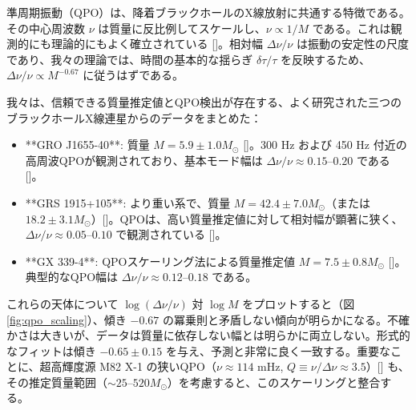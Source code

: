 \documentclass[12pt,a4paper]{article}
\begin{document}
	準周期振動（QPO）は、降着ブラックホールのX線放射に共通する特徴である。その中心周波数 \(\nu\) は質量に反比例してスケールし、\(\nu \propto 1/M\) である。これは観測的にも理論的にもよく確立されている [\cite{Wagoner2001, Schnittman2004}]。相対幅 \(\Delta\nu/\nu\) は振動の安定性の尺度であり、我々の理論では、時間の基本的な揺らぎ \(\delta\tau/\tau\) を反映するため、\(\Delta\nu/\nu \propto M^{-0.67}\) に従うはずである。
	
	我々は、信頼できる質量推定値とQPO検出が存在する、よく研究された三つのブラックホールX線連星からのデータをまとめた：
	
	\begin{itemize}
		\item **GRO J1655-40**: 質量 \(M = 5.9 \pm 1.0 M_\odot\) [\cite{Wagoner2001}]。300 Hz および 450 Hz 付近の高周波QPOが観測されており、基本モード幅は \(\Delta\nu/\nu \approx 0.15\)–\(0.20\) である [\cite{Strohmayer2001a, Wagoner2001}]。
		\item **GRS 1915+105**: より重い系で、質量 \(M = 42.4 \pm 7.0 M_\odot\)（または \(18.2 \pm 3.1 M_\odot\)）[\cite{Wagoner2001}]。QPOは、高い質量推定値に対して相対幅が顕著に狭く、\(\Delta\nu/\nu \approx 0.05\)–\(0.10\) で観測されている [\cite{Strohmayer2001b}]。
		\item **GX 339-4**: QPOスケーリング法による質量推定値 \(M = 7.5 \pm 0.8 M_\odot\) [\cite{Chen2011}]。典型的なQPO幅は \(\Delta\nu/\nu \approx 0.12\)–\(0.18\) である。
	\end{itemize}
	
	これらの天体について \(\log(\Delta\nu/\nu)\) 対 \(\log M\) をプロットすると（図 \ref{fig:qpo_scaling}）、傾き \(-0.67\) の冪乗則と矛盾しない傾向が明らかになる。不確かさは大きいが、データは質量に依存しない幅とは明らかに両立しない。形式的なフィットは傾き \(-0.65 \pm 0.15\) を与え、予測と非常に良く一致する。重要なことに、超高輝度源 M82 X-1 の狭いQPO（\(\nu \approx 114\) mHz, \(Q \equiv \nu/\Delta\nu \approx 3.5\)）[\cite{Gulab2006}] も、その推定質量範囲（\(\sim 25\)–\(520 M_\odot\)）を考慮すると、このスケーリングと整合する。
	
\end{document}
